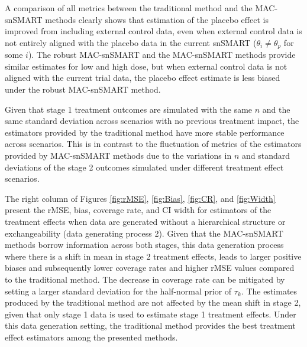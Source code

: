 A comparison of all metrics between the traditional method and the \ac{MAC}-snSMART methods clearly shows that estimation of the placebo effect is improved from including external control data, even when external control data is not entirely aligned with the placebo data in the current \ac{snSMART} ($\theta_{i} \ne \theta_p$ for some $i$). The robust \ac{MAC}-snSMART and the \ac{MAC}-snSMART methods provide similar estimates for low and high dose, but when external control data is not aligned with the current trial data, the placebo effect estimate is less biased under the robust \ac{MAC}-snSMART method.  

Given that stage 1 treatment outcomes are simulated with the same $n$ and the same standard deviation across scenarios with no previous treatment impact, the estimators provided by the traditional method have more stable performance across scenarios. This is in contrast to the fluctuation of metrics of the estimators provided by \ac{MAC}-snSMART methods due to the variations in $n$ and standard deviations of the stage 2 outcomes simulated under different treatment effect scenarios. 

The right column of Figures \ref{fig:rMSE}, \ref{fig:Bias}, \ref{fig:CR}, and \ref{fig:Width} present the \ac{rMSE}, bias, coverage rate, and \ac{CI} width for estimators of the treatment effects when data are generated without a hierarchical structure or exchangeability (data generating process 2). Given that the \ac{MAC}-snSMART methods borrow information across both stages, this data generation process where there is a shift in mean in stage 2 treatment effects, leads to larger positive biases and subsequently lower coverage rates and higher \ac{rMSE} values compared to the traditional method. The decrease in coverage rate can be mitigated by setting a larger standard deviation for the half-normal prior of $\tau_k$. The estimates produced by the traditional method are not affected by the mean shift in stage 2, given that only stage 1 data is used to estimate stage 1 treatment effects. Under this data generation setting, the traditional method provides the best treatment effect estimators among the presented methods. 

